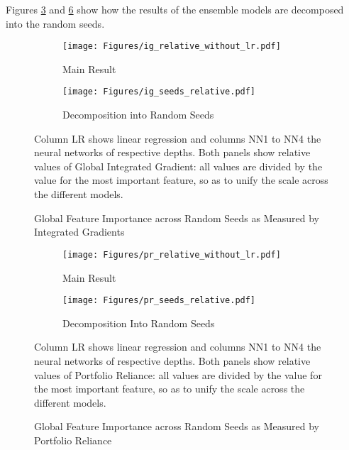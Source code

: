 	Figures \ref{fig:ig_seeds} and \ref{fig:pr_seeds} show how the results of the ensemble models are decomposed into the random seeds. 

	\begin{figure}	
		\centering		
		\begin{subfigure}[t]{\textwidth}
			\texttt{[image: Figures/ig\_relative\_without\_lr.pdf]}
			\caption{Main Result}
			\label{fig:ig_seeds_main}
		\end{subfigure}
		
		\begin{subfigure}[t]{\textwidth}
			\centering
			\texttt{[image: Figures/ig\_seeds\_relative.pdf]}
			\caption{Decomposition into Random Seeds}
			\label{fig:ig_seeds_relative}
		\end{subfigure}
		\caption{Global Feature Importance across Random Seeds as Measured by Integrated Gradients}
		\label{fig:ig_seeds}
		\medskip
		\small
		Column LR shows linear regression and columns NN1 to NN4 the neural networks of respective depths. Both panels show relative values of Global Integrated Gradient: all values are divided by the value for the most important feature, so as to unify the scale across the different models. 
	\end{figure}
	
	\begin{figure}	
		\centering		
		\begin{subfigure}[t]{\textwidth}
			\texttt{[image: Figures/pr\_relative\_without\_lr.pdf]}
			\caption{Main Result}
			\label{fig:pr_seeds_main}
		\end{subfigure}
		
		\begin{subfigure}[t]{\textwidth}
			\centering
			\texttt{[image: Figures/pr\_seeds\_relative.pdf]}
			\caption{Decomposition Into Random Seeds}
			\label{fig:pr_seeds_relative}
		\end{subfigure}
		\caption{Global Feature Importance across Random Seeds as Measured by Portfolio Reliance}
		\label{fig:pr_seeds}
		\medskip
		\small
		Column LR shows linear regression and columns NN1 to NN4 the neural networks of respective depths. Both panels show relative values of Portfolio Reliance: all values are divided by the value for the most important feature, so as to unify the scale across the different models.
	\end{figure}
	
	
